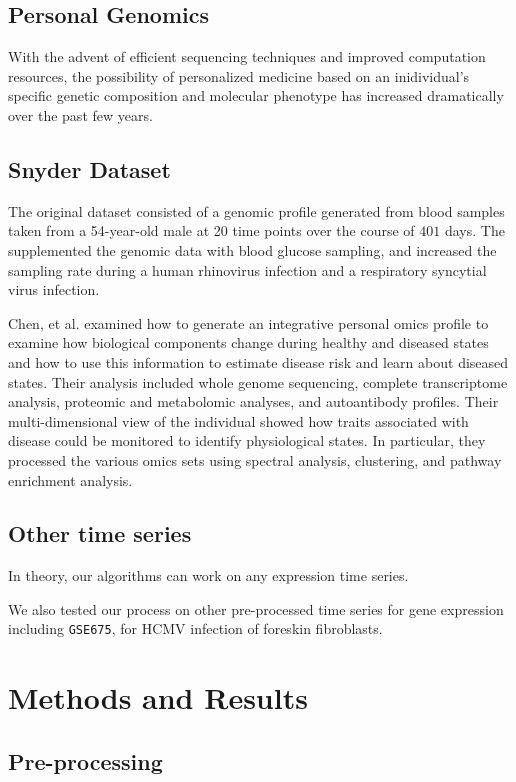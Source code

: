 \documentclass[aps,prd,final,onecolumn,a4paper,10pt]{revtex4}
\begin{document}
\subsection{Personal Genomics}
With the advent of efficient sequencing techniques and improved computation resources, the possibility of personalized medicine based on an inidividual's specific genetic composition and molecular phenotype has increased dramatically over the past few years.


\subsection{Snyder Dataset}
The original dataset consisted of a genomic profile generated from blood samples taken from a 54-year-old male at 20 time points over the course of $401$ days. The supplemented the genomic data with blood glucose sampling, and increased the sampling rate during a human rhinovirus infection and a respiratory syncytial virus infection. 

Chen, et al. examined how to generate an integrative personal omics profile to examine how biological components change during healthy and diseased states and how to use this information to estimate disease risk and learn about diseased states. Their analysis included whole genome sequencing, complete transcriptome analysis, proteomic and metabolomic analyses, and autoantibody profiles.
Their multi-dimensional view of the individual showed how traits associated with disease could be monitored to identify physiological states.
In particular, they processed the various omics sets using spectral analysis, clustering, and pathway enrichment analysis.

\subsection{Other time series}
In theory, our algorithms can work on any expression time series.

We also tested our process on other pre-processed time series for gene expression including \verb!GSE675!, for HCMV infection of foreskin fibroblasts.

\section{Methods and Results}

\subsection{Pre-processing}
\end{document}

